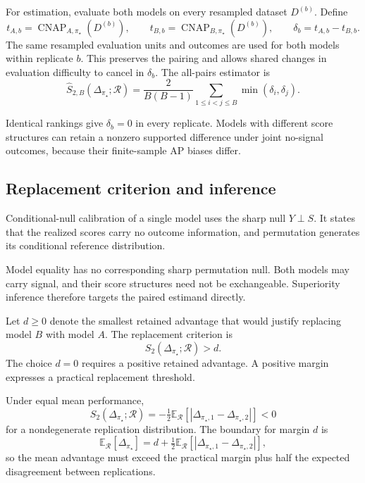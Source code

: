\documentclass[11pt]{article}
\newcommand{\CNAP}{\operatorname{CNAP}}
\newcommand{\Regime}{\mathcal{R}}
\newcommand{\E}{\mathbb{E}}
\theoremstyle{remark}
\begin{document}
For estimation, evaluate both models on every resampled dataset $D^{(b)}$. Define
\[
t_{A,b}=\CNAP_{A,\pi_\star}(D^{(b)}),
\qquad
t_{B,b}=\CNAP_{B,\pi_\star}(D^{(b)}),
\qquad
\delta_b=t_{A,b}-t_{B,b}.
\]
The same resampled evaluation units and outcomes are used for both models within replicate $b$. This preserves the pairing and allows shared changes in evaluation difficulty to cancel in $\delta_b$. The all-pairs estimator is
\begin{equation}
\widehat S_{2,B}(\Delta_{\pi_\star};\Regime)
=
\frac{2}{B(B-1)}
\sum_{1\leq i<j\leq B}
\min(\delta_i,\delta_j).
\label{eq:paired-estimator}
\end{equation}

Identical rankings give $\delta_b=0$ in every replicate. Models with different score structures can retain a nonzero supported difference under joint no-signal outcomes, because their finite-sample AP biases differ.

\subsection{Replacement criterion and inference}
\label{sec:superiority}

Conditional-null calibration of a single model uses the sharp null $Y\perp S$. It states that the realized scores carry no outcome information, and permutation generates its conditional reference distribution.

Model equality has no corresponding sharp permutation null. Both models may carry signal, and their score structures need not be exchangeable. Superiority inference therefore targets the paired estimand directly.

Let $d\geq0$ denote the smallest retained advantage that would justify replacing model $B$ with model $A$. The replacement criterion is
\[
S_2(\Delta_{\pi_\star};\Regime)>d .
\]
The choice $d=0$ requires a positive retained advantage. A positive margin expresses a practical replacement threshold.

Under equal mean performance,
\[
S_2(\Delta_{\pi_\star};\Regime)
=
-\tfrac12\E_{\Regime}\left[|\Delta_{\pi_\star,1}-\Delta_{\pi_\star,2}|\right]
<
0
\]
for a nondegenerate replication distribution. The boundary for margin $d$ is
\[
\E_{\Regime}[\Delta_{\pi_\star}]
=
d+\tfrac12
\E_{\Regime}\left[|\Delta_{\pi_\star,1}-\Delta_{\pi_\star,2}|\right],
\]
so the mean advantage must exceed the practical margin plus half the expected disagreement between replications.
\end{document}
